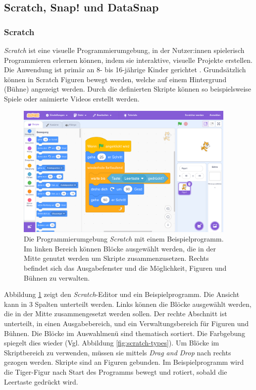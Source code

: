 \newcommand{\Scratch}{\textit{Scratch}}
\newcommand{\Snap}{\textit{Snap!}}
\newcommand{\DataSnap}{\textit{DataSnap}}

\subsection{Scratch, Snap! und DataSnap}
\subsubsection{Scratch}

\Scratch{} ist eine visuelle Programmierumgebung, in der Nutzer:innen spielerisch Programmieren erlernen können, indem sie interaktive, visuelle Projekte erstellen. Die Anwendung ist primär an 8- bis 16-jährige Kinder gerichtet \parencite{maloneyScratchProgramming2010}. Grundsätzlich können in Scratch Figuren bewegt werden, welche auf einem Hintergrund (Bühne) angezeigt werden. Durch die definierten Skripte können so beispielsweise Spiele oder animierte Videos erstellt werden.

\begin{figure}[!ht]
  \begin{center}
    \includegraphics[width=0.95\textwidth]{assets/scratch.png}
  \end{center}
  \caption[Die Programmierumgebung \Scratch{} mit einem Beispielprogramm]{Die Programmierumgebung \Scratch{} mit einem Beispielprogramm. Im linken Bereich können Blöcke ausgewählt werden, die in der Mitte genutzt werden um Skripte zusammenzusetzen. Rechts befindet sich das Ausgabefenster und die Möglichkeit, Figuren und Bühnen zu verwalten.}
  \label{fig:scratch}
\end{figure}

Abbildung \ref{fig:scratch} zeigt den \Scratch{}-Editor und ein Beispielprogramm. Die Ansicht kann in 3 Spalten unterteilt werden. Links können die Blöcke ausgewählt werden, die in der Mitte zusammengesetzt werden sollen. Der rechte Abschnitt ist unterteilt, in einen Ausgabebereich, und ein Verwaltungsbereich für Figuren und Bühnen. Die Blöcke im Auswahlmenü sind thematisch sortiert. Die Farbgebung spiegelt dies wieder (Vgl. Abbildung \ref{fig:scratch-types}). Um Blöcke im Skriptbereich zu verwenden, müssen sie mittels \textit{Drag and Drop} nach rechts gezogen werden. Skripte sind an Figuren gebunden. Im Beispielprogramm wird die Tiger-Figur nach Start des Programms bewegt und rotiert, sobald die Leertaste gedrückt wird.
\parencite{maloneyScratchProgramming2010}

